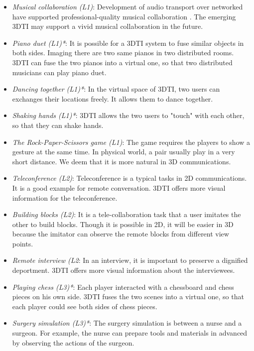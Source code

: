 \begin{itemize}
    \item \emph{Musical collaboration (L1)}: Development of audio transport over networked have supported professional-quality musical collaboration \cite{carot2007networked, carot2007network}. The emerging 3DTI may support a vivid musical collaboration in the future.
    \item \emph{Piano duet (L1)*}: It is possible for a 3DTI system to fuse similar objects in both sides. Imaging there are two same pianos in two distributed rooms. 3DTI can fuse the two pianos into a virtual one, so that two distributed musicians can play piano duet.
    \item \emph{Dancing together (L1)*}: In the virtual space of 3DTI, two users can exchanges their locations freely. It allows them to dance together.
    \item \emph{Shaking hands (L1)*}: 3DTI allows the two users to "touch" with each other, so that they can shake hands.
    \item \emph{The Rock-Paper-Scissors game (L1)}: The game requires the players to show a gesture at the same time. In physical world, a pair usually play in a very short distance. We deem that it is more natural in 3D communications.
    \item \emph{Teleconference (L2)}: Teleconference is a typical tasks in 2D communications. It is a good example for remote conversation. 3DTI offers more visual information for the teleconference.
    \item \emph{Building blocks (L2)}: It is a tele-collaboration task that a user imitates the other to build blocks. Though it is possible in 2D, it will be easier in 3D because the imitator can observe the remote blocks from different view points.
    \item \emph{Remote interview (L2}: In an interview, it is important to preserve a dignified deportment. 3DTI offers more visual information about the interviewees.
    \item \emph{Playing chess (L3)*}: Each player interacted with a chessboard and chess pieces on his own side. 3DTI fuses the two scenes into a virtual one, so that each player could see both sides of chess pieces.
    \item \emph{Surgery simulation (L3)*}: The surgery simulation is between a nurse and a surgeon. For example, the nurse can prepare tools and materials in advanced by observing the actions of the surgeon.
\end{itemize}{}

